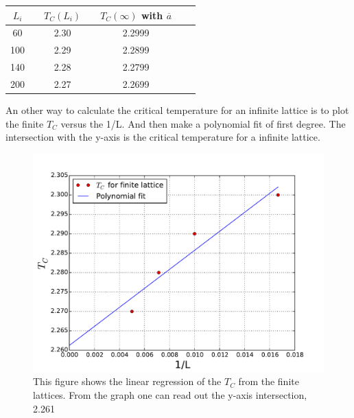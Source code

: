 \begin{center}
\label{tab:t-c}
\begin{tabularx}{\textwidth}{c X c X c X c }
    \hline 
    \hline 
        $L_i$ && $T_C(L_i)$ && $T_C(\infty)$ with $\overline{a}$ \\ 
    \hline
        60      &&  2.30  && 2.2999\\
        100     &&  2.29  && 2.2899\\
        140     &&  2.28  && 2.2799\\
        200     &&  2.27  && 2.2699\\
    \hline
\end{tabularx}
\end{center}

An other way to calculate the critical temperature for an infinite lattice is to plot the finite $T_C$ versus the 1/L. And then make a polynomial fit of first degree. The intersection with the y-axis is the critical temperature for a infinite lattice.

\begin{figure}[H]
    \centering
    \includegraphics[width=0.5\linewidth]{result/bilder/tc/polyfit}
    \caption{This figure shows the linear regression of the $T_C$ from the finite lattices. From the graph one can read out the y-axis intersection, 2.261}
    \label{fig:polyfit}
\end{figure}

